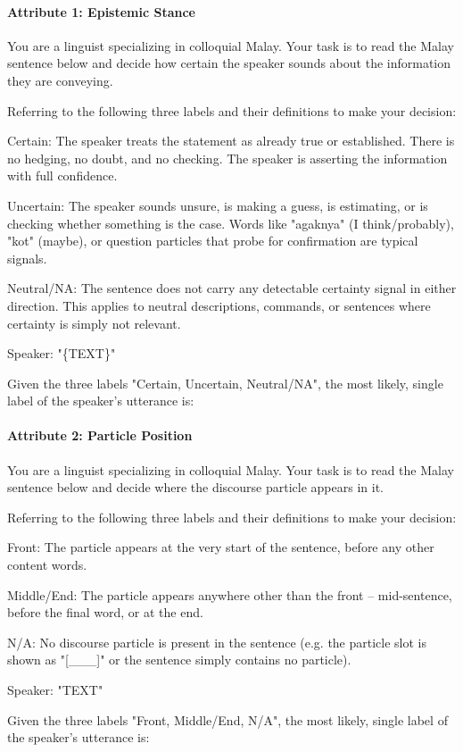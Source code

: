 \documentclass[11pt]{article}
\begin{document}
\paragraph{Attribute 1: Epistemic Stance}
\begin{PromptBlock}
You are a linguist specializing in colloquial Malay. Your task is to read the Malay sentence below and decide how certain the speaker sounds about the information they are conveying.

Referring to the following three labels and their definitions to make your decision:

Certain: The speaker treats the statement as already true or established. There is no hedging, no doubt, and no checking. The speaker is asserting the information with full confidence.

Uncertain: The speaker sounds unsure, is making a guess, is estimating, or is checking whether something is the case. Words like "agaknya" (I think/probably), "kot" (maybe), or question particles that probe for confirmation are typical signals.

Neutral/NA: The sentence does not carry any detectable certainty signal in either direction. This applies to neutral descriptions, commands, or sentences where certainty is simply not relevant.

Speaker: "\{TEXT\}"

Given the three labels "Certain, Uncertain, Neutral/NA", the most likely, single label of the speaker's utterance is:
\end{PromptBlock}

\paragraph{Attribute 2: Particle Position}
\begin{PromptBlock}
You are a linguist specializing in colloquial Malay. Your task is to read the Malay sentence below and decide where the discourse particle appears in it.

Referring to the following three labels and their definitions to make your decision:

Front: The particle appears at the very start of the sentence, before any other content words.

Middle/End: The particle appears anywhere other than the front -- mid-sentence, before the final word, or at the end.

N/A: No discourse particle is present in the sentence (e.g. the particle slot is shown as "[\_\_\_]" or the sentence simply contains no particle).

Speaker: "{TEXT}"

Given the three labels "Front, Middle/End, N/A", the most likely, single label of the speaker's utterance is:
\end{PromptBlock}
\end{document}
